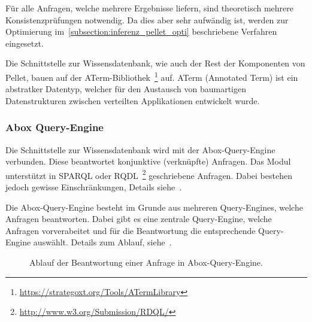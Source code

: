 Für alle Anfragen, welche mehrere Ergebnisse liefern, sind theoretisch mehrere Konsistenzprüfungen notwendig. Da dies aber sehr aufwändig ist, werden zur Optimierung im~\autoref{subsection:inferenz_pellet_opti} beschriebene Verfahren eingesetzt.

Die Schnittstelle zur Wissensdatenbank, wie auch der Rest der Komponenten von Pellet, bauen auf der ATerm-Bibliothek~\footnote{\url{https://strategoxt.org/Tools/ATermLibrary}} auf. ATerm (Annotated Term) ist ein abstratker Datentyp, welcher für den Austausch von baumartigen Datenstrukturen zwischen verteilten Applikationen entwickelt wurde.

\subsubsection{Abox Query-Engine}
\label{ssubsection:inferenz_pellet_aboxquery}
Die Schnittstelle zur Wissensdatenbank wird mit der Abox-Query-Engine verbunden. Diese beantwortet konjunktive (verknüpfte) Anfragen. Das Modul unterstützt in SPARQL oder RQDL~\footnote{\url{http://www.w3.org/Submission/RDQL/}} geschriebene Anfragen. Dabei bestehen jedoch gewisse Einschränkungen, Details siehe~\cite[Seiten 10 und 11]{sirin:pellet05}.

Die Abox-Query-Engine besteht im Grunde aus mehreren Query-Engines, welche Anfragen beantworten. Dabei gibt es eine zentrale Query-Engine, welche Anfragen vorverabeitet und für die Beantwortung die entsprechende Query-Engine auswählt. Details zum Ablauf, siehe~\cite[Seite 11]{sirin:pellet05}.

\begin{figure}[htbp]
    \centering {}
    \caption{Ablauf der Beantwortung einer Anfrage in Abox-Query-Engine.\label{fig:pellet_queryengine_komponenten}\protect\footnotemark}
\end{figure}

